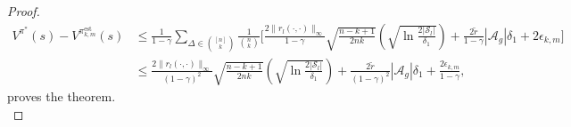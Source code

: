 \documentclass{article}
\theoremstyle{plain}
\theoremstyle{definition}
\def\est{\mathrm{est}}
\begin{document}
\begin{proof}
\begin{align*}
V^{{\pi}^*}(s) - V^{{{\pi}}_{k,m}^\est}(s) &\leq \frac{1}{1-\gamma}\sum_{\Delta\in\binom{[n]}{k}}\frac{1}{\binom{n}{k}}\bigg[\frac{2\|r_l(\cdot,\cdot)\|_\infty}{1-\gamma}\sqrt{\frac{n-k+1}{2nk}}\left(\sqrt{\ln \frac{2|\mathcal{S}_l|}{\delta_1}}\right)+\frac{2\tilde{r}}{1-\gamma}|\mathcal{A}_g|\delta_1 + 2\epsilon_{k,m}\bigg] \\
&\leq \frac{2\|r_l(\cdot,\cdot)\|_\infty}{(1-\gamma)^2}\sqrt{\frac{n-k+1}{2nk}}\left(\sqrt{\ln\frac{2|\mathcal{S}_l|}{\delta_1}}\right) +  \frac{2\tilde{r}}{(1-\gamma)^2}|\mathcal{A}_g|\delta_1+ \frac{2\epsilon_{k,m}}{1-\gamma},
\end{align*}
 proves the theorem. \qedhere \\
 \end{proof}
\end{document}
